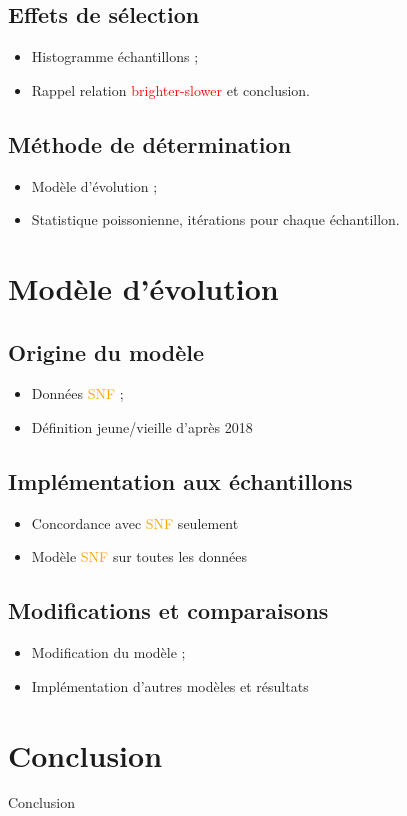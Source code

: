 \documentclass[a4paper, 12pt, svgnames]{article}
\begin{document}
\subsection{Effets de sélection}
\begin{itemize}
    \item Histogramme échantillons ;
    \item Rappel relation \textcolor{red}{brighter-slower} et conclusion.
\end{itemize}

\subsection{Méthode de détermination}
\begin{itemize}
    \item Modèle d'évolution ;
    \item Statistique poissonienne, itérations pour chaque échantillon.
\end{itemize}

\section{Modèle d'évolution}
\subsection{Origine du modèle}
\begin{itemize}
    \item Données \textcolor{orange}{SNF} ;
    \item Définition jeune/vieille d'après  2018
\end{itemize}

\subsection{Implémentation aux échantillons}
\begin{itemize}
    \item Concordance avec \textcolor{orange}{SNF} seulement
    \item Modèle \textcolor{orange}{SNF} sur toutes les données
\end{itemize}

\subsection{Modifications et comparaisons}
\begin{itemize}
    \item Modification du modèle ;
    \item Implémentation d'autres modèles et résultats
\end{itemize}

\section{Conclusion}
Conclusion



\end{document}
